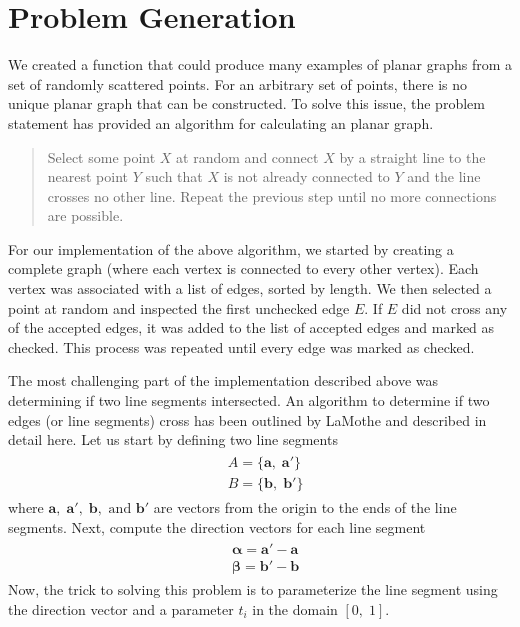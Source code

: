 \documentclass{article}
\newcommand{\ve}[1]{\boldsymbol{\mathbf{#1}}}
\begin{document}
\section{Problem Generation}
	We created a function that could produce many examples of planar graphs from a set of randomly scattered points. For an arbitrary set of points, there is no unique planar graph that can be constructed. To solve this issue, the problem statement has provided an algorithm for calculating an planar graph. 
	\begin{quote}
	Select some point $X$ at random and connect $X$ by a straight line
	to the nearest point $Y$ such that $X$ is not already connected to $Y$ and the line crosses no other line. Repeat the
	previous step until no more connections are possible.
	\end{quote}
	For our implementation of the above algorithm, we started by creating a complete graph (where each vertex is connected to every other vertex). Each vertex was associated with a list of edges, sorted by length. 
	We then selected a point at random and inspected the first unchecked edge $E$. If $E$ did not cross any of the accepted edges, it was added to the list of accepted edges and marked as checked. This process was repeated until every edge was marked as checked. \par
	The most challenging part of the implementation described above was determining if two line segments intersected. An algorithm to determine if two edges (or line segments) cross has been outlined by LaMothe \cite{tricks} and described in detail here. Let us start by defining two line segments 
	\begin{align}
		\begin{split}
			& A = \{ \ve{a},\; \ve{a'} \} \\
			& B = \{\ve{b}, \;\ve{b'}\}
		\end{split}
	\end{align}
	where $\ve{a}, \; \ve{a'}, \; \ve{b}, \text{ and } \ve{b'}$ are vectors from the origin to the ends of the line segments. Next, compute the direction vectors for each line segment
	\begin{align}
		\begin{split}
			&\ve{\alpha} = \ve{a}' - \ve{a} \\
			&\ve{\beta} = \ve{b}' - \ve{b} 
		\end{split}
	\end{align}
	Now, the trick to solving this problem is to parameterize the line segment using the direction vector and a parameter $t_i$ in the domain $[0, \; 1]$.
\end{document}
